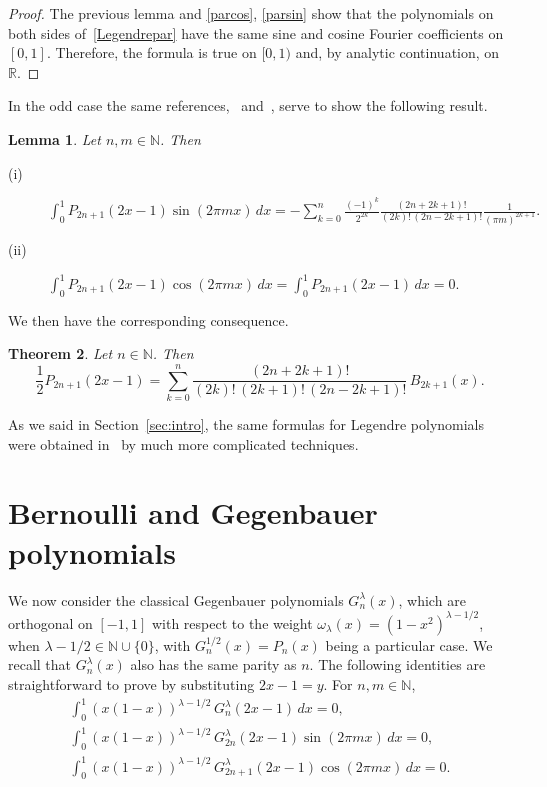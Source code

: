 \documentclass[a4paper,reqno]{amsart}
\newcommand{\N}{\mathbb{N}}
\newcommand{\R}{\mathbb{R}}
\theoremstyle{plain}
\newtheorem{Teor}{Theorem}[section]
\newtheorem{Lema}[Teor]{Lemma}
\numberwithin{equation}{section}
\theoremstyle{remark}
\begin{document}
\begin{proof}
The previous lemma and \eqref{parcos}, \eqref{parsin} show that the polynomials on both sides of~\eqref{Legendrepar} have the same sine and cosine Fourier coefficients on $[0,1]$. Therefore, the formula is true on $[0,1)$ and, by analytic continuation, on~$\R$.
\end{proof}

In the odd case the same references,~\cite{AS} and~\cite{PBM}, serve to show the following result.

\begin{Lema} 
Let $n,m\in\N$. Then
\begin{description}
  \item[(i)] $\displaystyle \int_0^1 P_{2n+1}(2x-1) \sin(2\pi mx)\,dx
  = - \sum_{k=0}^{n} \frac{(-1)^{k}}{2^{2k}} \frac{(2n+2k+1)!}{(2k)!\,(2n-2k+1)!} \frac{1}{(\pi m)^{2k+1}}.
$
  \item[(ii)] $\displaystyle \int_0^1 P_{2n+1}(2x-1) \cos(2\pi mx)\,dx
  = \int_0^1 P_{2n+1}(2x-1)\,dx = 0.
$
\end{description}
\end{Lema}

We then have the corresponding consequence.

\begin{Teor} 
Let $n\in\N$. Then
\begin{equation}
\label{Legendreimpar}
  \frac{1}{2}P_{2n+1}(2x-1) = \sum_{k=0}^{n} \frac{(2n+2k+1)!}{(2k)!\,(2k+1)!\,(2n-2k+1)!}\,B_{2k+1}(x).
\end{equation}
\end{Teor}

As we said in Section~\ref{sec:intro}, the same formulas for Legendre polynomials were obtained in~\cite{VuNg-Z,VuNg-B} by much more complicated techniques.

\section{Bernoulli and Gegenbauer polynomials}
\label{sec:BerGen}

We now consider the classical Gegenbauer polynomials $G_n^\lambda(x)$, which are orthogonal on $[-1,1]$ with respect to the weight $\omega_\lambda(x) = (1-x^2)^{\lambda-1/2}$, when $\lambda-1/2\in\N \cup \{0\}$, with $G_n^{1/2}(x) = P_n(x)$ being a particular case. We recall that $G_n^\lambda(x)$ also has the same parity as $n$. The following identities are straightforward to prove by substituting $2x-1 = y$. For $n,m\in\N$,
\begin{gather*}
  \int_0^1 (x(1-x))^{\lambda-1/2}\,G_{n}^\lambda (2x-1)\,dx = 0,
  \\
  \int_0^1 (x(1-x))^{\lambda-1/2}\,G_{2n}^\lambda (2x-1) \sin(2\pi mx)\,dx = 0,
  \\
  \int_0^1 (x(1-x))^{\lambda-1/2}\,G_{2n+1}^\lambda (2x-1) \cos(2\pi mx)\,dx = 0.
\end{gather*}
\end{document}
